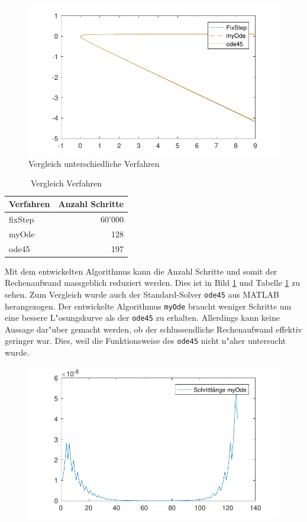 \begin{refsection}
\begin{figure}
\centering
\includegraphics{schrittlaenge/images/vergleichVerfahren.pdf}
\caption{Vergleich unterschiedliche Verfahren}
\label{image:vergleichVerfahren}
\end{figure}
\begin{table}
\centering
\begin{tabular}{|l|r|}
\hline
Verfahren & Anzahl Schritte\\ \hline
fixStep & 60'000\\
myOde & 128\\
ode45 & 197\\
\hline
\end{tabular}
\caption{Vergleich Verfahren}
\label{table:vergleichVerfahren}
\end{table}
Mit dem entwickelten Algorithmus kann die Anzahl Schritte und somit der Rechenaufwand massgeblich reduziert werden.
Dies ist in Bild \ref{image:vergleichVerfahren} und Tabelle \ref{table:vergleichVerfahren} zu sehen.
Zum Vergleich wurde auch der Standard-Solver \texttt{ode45} aus MATLAB herangezogen.
Der entwickelte Algorithmus \texttt{myOde} braucht weniger Schritte um eine bessere L"osungskurve als der \texttt{ode45} zu erhalten.
Allerdings kann keine Aussage dar"uber gemacht werden, ob der schlussendliche Rechenaufwand effektiv geringer war.
Dies, weil die Funktionsweise des \texttt{ode45} nicht n"aher untersucht wurde.
\begin{figure}
\centering
\includegraphics{schrittlaenge/images/verlaufSchrittlaenge.pdf}

\end{figure}
\end{refsection}

